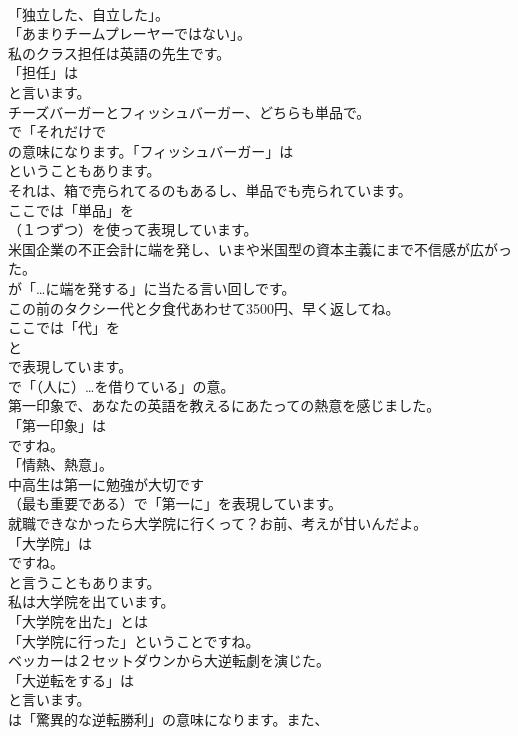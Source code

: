 \documentclass[8pt]{extreport}
\begin{document}
\begin{CJK}{UTF8}{min}
\\	「独立した、自立した」。
\\	「あまりチームプレーヤーではない」。	
\\	私のクラス担任は英語の先生です。 
\\	「担任」は
\\	と言います。	
\\	チーズバーガーとフィッシュバーガー、どちらも単品で。 
\\	で「それだけで 
\\	の意味になります。「フィッシュバーガー」は
\\	ということもあります。	
\\	それは、箱で売られてるのもあるし、単品でも売られています。 
\\	ここでは「単品」を
\\	（１つずつ）を使って表現しています。	
\\	米国企業の不正会計に端を発し、いまや米国型の資本主義にまで不信感が広がった。 
\\	が「…に端を発する」に当たる言い回しです。	
\\	この前のタクシー代と夕食代あわせて3500円、早く返してね。 
\\	ここでは「代」を 
\\	と 
\\	で表現しています。
\\	で「（人に）…を借りている」の意。	
\\	第一印象で、あなたの英語を教えるにあたっての熱意を感じました。 
\\	「第一印象」は
\\	ですね。
\\	「情熱、熱意」。	
\\	中高生は第一に勉強が大切です 
\\	（最も重要である）で「第一に」を表現しています。	
\\	就職できなかったら大学院に行くって？お前、考えが甘いんだよ。 
\\	「大学院」は
\\	ですね。
\\	と言うこともあります。	
\\	私は大学院を出ています。 
\\	「大学院を出た」とは
\\	「大学院に行った」ということですね。	
\\	ベッカーは２セットダウンから大逆転劇を演じた。 
\\	「大逆転をする」は
\\	と言います。
\\	は「驚異的な逆転勝利」の意味になります。また、

\end{CJK}
\end{document}
